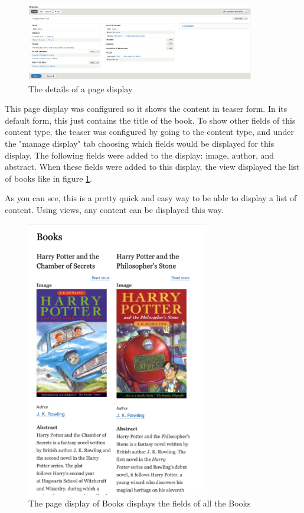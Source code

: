 \begin{figure}[h]
	\centering
	\includegraphics[width=10cm]{./img/Page_View_Config.png}
	\caption[Details of a page display]{The details of a page display}
\end{figure}

This page display was configured so it shows the content in teaser form. In its default form, this just contains the title of the book. To show other fields of this content type, the teaser was configured by going to the content type, and under the "manage display" tab choosing which fields would be displayed for this display. The following fields were added to the display: image, author, and abstract. When these fields were added to this display, the view displayed the list of books like in figure \ref{fig:Books}.

As you can see, this is a pretty quick and easy way to be able to display a list of content. Using views, any content can be displayed this way.

\begin{figure}[h]
	\centering
	\includegraphics[width=8cm]{./img/Books_Page.png}
	\caption[Display of a list of Books]{The page display of Books displays the fields of all the Books}
	\label{fig:Books}
\end{figure}

